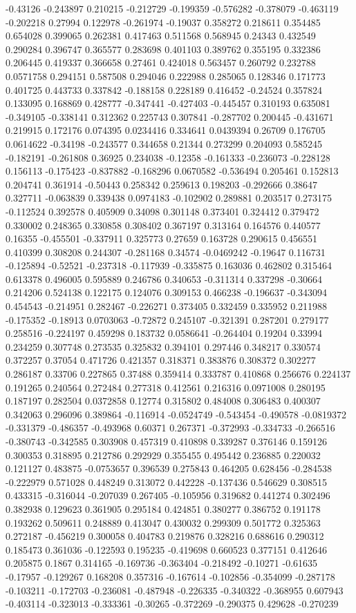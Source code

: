 -0.43126 -0.243897 0.210215 -0.212729 -0.199359 -0.576282 -0.378079 -0.463119 -0.202218 0.27994 0.122978 -0.261974 -0.19037 0.358272 0.218611 0.354485 0.654028 0.399065 0.262381 0.417463 0.511568 0.568945 0.24343 0.432549 0.290284 0.396747 0.365577 0.283698 0.401103 0.389762 0.355195 0.332386 0.206445 0.419337 0.366658 0.27461 0.424018 0.563457 0.260792 0.232788 0.0571758 0.294151 0.587508 0.294046 0.222988 0.285065 0.128346 0.171773 0.401725 0.443733 0.337842 -0.188158 0.228189 0.416452 -0.24524 0.357824 0.133095 0.168869 0.428777 -0.347441 -0.427403 -0.445457 0.310193 0.635081 -0.349105 -0.338141 0.312362 0.225743 0.307841 -0.287702 0.200445 -0.431671 0.219915 0.172176 0.074395 0.0234416 0.334641 0.0439394 0.26709 0.176705 0.0614622 -0.34198 -0.243577 0.344658 0.21344 0.273299 0.204093 0.585245 -0.182191 -0.261808 0.36925 0.234038 -0.12358 -0.161333 -0.236073 -0.228128 0.156113 -0.175423 -0.837882 -0.168296 0.0670582 -0.536494 0.205461 0.152813 0.204741 0.361914 -0.50443 0.258342 0.259613 0.198203 -0.292666 0.38647 0.327711 -0.063839 0.339438 0.0974183 -0.102902 0.289881 0.203517 0.273175 -0.112524 0.392578 0.405909 0.34098 0.301148 0.373401 0.324412 0.379472 0.330002 0.248365 0.330858 0.308402 0.367197 0.313164 0.164576 0.440577 0.16355 -0.455501 -0.337911 0.325773 0.27659 0.163728 0.290615 0.456551 0.410399 0.308208 0.244307 -0.281168 0.34574 -0.0469242 -0.19647 0.116731 -0.125894 -0.52521 -0.237318 -0.117939 -0.335875 0.163036 0.462802 0.315464 0.613378 0.496005 0.595889 0.246786 0.340653 -0.311314 0.337298 -0.30664 0.214206 0.524138 0.122175 0.124076 0.309153 0.466238 -0.196637 -0.343094 0.454543 -0.214951 0.282467 -0.226271 0.373405 0.332459 0.335952 0.211988 -0.175352 -0.18913 0.0703063 -0.72872 0.245107 -0.321391 0.287201 0.279177 0.258516 -0.224197 0.459298 0.183732 0.0586641 -0.264404 0.19204 0.33994 0.234259 0.307748 0.273535 0.325832 0.394101 0.297446 0.348217 0.330574 0.372257 0.37054 0.471726 0.421357 0.318371 0.383876 0.308372 0.302277 0.286187 0.33706 0.227865 0.37488 0.359414 0.333787 0.410868 0.256676 0.224137 0.191265 0.240564 0.272484 0.277318 0.412561 0.216316 0.0971008 0.280195 0.187197 0.282504 0.0372858 0.12774 0.315802 0.484008 0.306483 0.400307 0.342063 0.296096 0.389864 -0.116914 -0.0524749 -0.543454 -0.490578 -0.0819372 -0.331379 -0.486357 -0.493968 0.60371 0.267371 -0.372993 -0.334733 -0.266516 -0.380743 -0.342585 0.303908 0.457319 0.410898 0.339287 0.376146 0.159126 0.300353 0.318895 0.212786 0.292929 0.355455 0.495442 0.236885 0.220032 0.121127 0.483875 -0.0753657 0.396539 0.275843 0.464205 0.628456 -0.284538 -0.222979 0.571028 0.448249 0.313072 0.442228 -0.137436 0.546629 0.308515 0.433315 -0.316044 -0.207039 0.267405 -0.105956 0.319682 0.441274 0.302496 0.382938 0.129623 0.361905 0.295184 0.424851 0.380277 0.386752 0.191178 0.193262 0.509611 0.248889 0.413047 0.430032 0.299309 0.501772 0.325363 0.272187 -0.456219 0.300058 0.404783 0.219876 0.328216 0.688616 0.290312 0.185473 0.361036 -0.122593 0.195235 -0.419698 0.660523 0.377151 0.412646 0.205875 0.1867 0.314165 -0.169736 -0.363404 -0.218492 -0.10271 -0.61635 -0.17957 -0.129267 0.168208 0.357316 -0.167614 -0.102856 -0.354099 -0.287178 -0.103211 -0.172703 -0.236081 -0.487948 -0.226335 -0.340322 -0.368955 0.607943 -0.403114 -0.323013 -0.333361 -0.30265 -0.372269 -0.290375 0.429628 -0.270239 